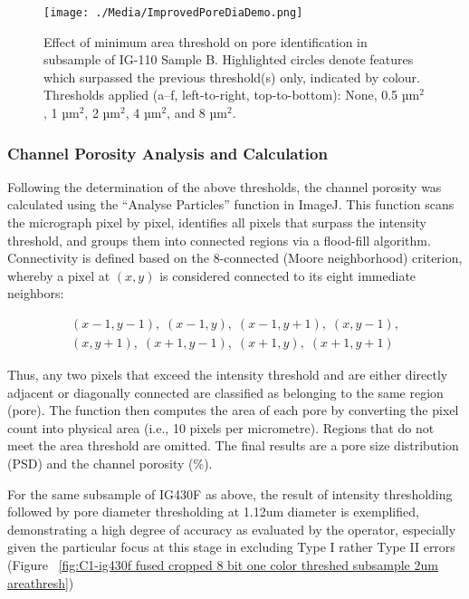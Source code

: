 \documentclass[3p,twocolumn]{elsarticle}
\begin{document}
\begin{figure}[!htbp]
    \centering
    \texttt{[image: ./Media/ImprovedPoreDiaDemo.png]}
    \caption{Effect of minimum area threshold on pore identification in subsample of IG-110 Sample B. Highlighted circles denote features which surpassed the previous threshold(s) only, indicated by colour. Thresholds applied (a–f, left-to-right, top-to-bottom): None, 0.5 µm\(^2\), 1 µm\(^2\), 2 µm\(^2\), 4 µm\(^2\), and 8 µm\(^2\).}
    \label{fig:improvedporediademo}
\end{figure}

\subsubsection{Channel Porosity Analysis and Calculation}
Following the determination of the above thresholds, the channel porosity was
calculated using the “Analyse Particles” function in ImageJ. This function scans
the micrograph pixel by pixel, identifies all pixels that surpass the intensity
threshold, and groups them into connected regions via a flood-fill algorithm.
Connectivity is defined based on the 8-connected (Moore neighborhood) criterion,
whereby a pixel at $(x,y)$ is considered connected to its eight immediate
neighbors:

\begin{multline*}
(x-1,y-1),\; (x-1,y),\; (x-1,y+1),\; (x,y-1),\\[4pt]
(x,y+1),\; (x+1,y-1),\; (x+1,y),\; (x+1,y+1)
\end{multline*}

Thus, any two pixels that exceed the intensity threshold and are either directly
adjacent or diagonally connected are classified as belonging to the same region
(pore). The function then computes the area of each pore by converting the pixel
count into physical area (i.e., 10 pixels per micrometre). Regions that do not
meet the area threshold are omitted. The final results are a pore size
distribution (PSD) and the channel porosity (\%).

For the same subsample of IG430F as above, the result of intensity thresholding
followed by pore diameter thresholding at 1.12um diameter is exemplified, demonstrating
a high degree of accuracy as evaluated by the operator, especially given the particular
focus at this stage in excluding Type I rather Type II errors (Figure ~\ref{fig:C1-ig430f fused cropped 8 bit one color threshed subsample 2um areathresh})
\end{document}
